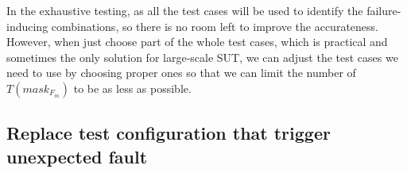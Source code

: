 \documentclass{sig-alternate}
\begin{document}
In the exhaustive testing, as all the test cases will be used to identify the failure-inducing combinations, so there is no room left to improve the accurateness. However, when just choose part of the whole test cases, which is practical and sometimes the only solution for large-scale SUT, we can adjust the test cases we need to use by choosing proper ones so that we can limit the number of $T(mask_{F_{m}})$ to  be as less as possible.



%
%
%
%

\subsection{Replace test configuration that trigger unexpected fault}
\end{document}
